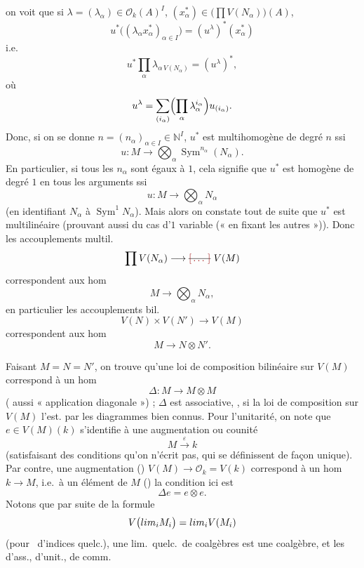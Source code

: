 \documentclass[11pt,a4paper]{article}
\begin{document}
\ill{} on voit que si $\lambda = (\lambda_\alpha) \in \mathcal{O}_k(A)^I$, $(x^*_\alpha) \in \bigl(\prod V(N_\alpha)\bigr)(A)$,
\[
  u^*\bigl((\lambda_\alpha x^*_\alpha)_{\alpha \in I}\bigr) = (u^\lambda)^*(x^*_\alpha)
\]
i.e.
\[
  u^* \prod_\alpha \lambda_{\alpha\, V(N_\alpha)} = (u^\lambda)^* ,
\]
où 
\[
  u^\lambda = \sum_{(i_\alpha)} \Bigl(\prod_\alpha \lambda_\alpha^{i_\alpha}\Bigr) u_{(i_\alpha)} .
\]
Donc, si on se donne $n = (n_\alpha)_{\alpha \in I} \in \mathbb{N}^I$, $u^*$ est multihomogène de degré $n$ ssi  \ill{}
\[
  u : M \longrightarrow \bigotimes_\alpha \operatorname{Sym}^{n_\alpha}(N_\alpha).
\]
En particulier, si tous les $n_\alpha$ sont égaux à $1$, cela signifie que $u^*$ est homogène de degré $1$ en tous les arguments ssi
\[
  u : M \longrightarrow \bigotimes_\alpha N_\alpha
\]
(en identifiant $N_\alpha$ à $\operatorname{Sym}^1 N_\alpha$). Mais alors on constate tout de suite que $u^*$ est \add{\ill{}} multilinéaire (prouvant aussi \struck{\ill{}} \ill{} \ill{} du cas d'$1$ variable (« en fixant les autres »)). Donc les accouplements multil.
\[
  \prod V(N_\alpha) \longrightarrow \text{\struck{\ill{}}}\ V(M)
\]
correspondent aux hom
\[
  M \longrightarrow \bigotimes_\alpha N_\alpha ,
\]
en particulier les accouplements bil.
\[
  V(N) \times V(N') \longrightarrow V(M)
\]
correspondent aux hom
\[
  M \longrightarrow N \otimes N' .
\]

Faisant $M = N = N'$, on trouve qu'une loi de composition bilinéaire sur $V(M)$ correspond à un hom
\[
  \Delta : M \longrightarrow M \otimes M
\]
( aussi « application diagonale ») ;  $\Delta$ est associative,  ,   si la loi de composition sur $V(M)$ l'est. \struck{\ill{}}  par les diagrammes bien connus. Pour l'unitarité, on note que $e \in V(M)(k)$ s'identifie à une augmentation ou counité
\[
  M \xrightarrow{\ \varepsilon\ } k
\]
(satisfaisant des conditions qu'on n'écrit pas, qui se définissent de façon unique). Par contre, une augmentation () $V(M) \to \mathcal{O}_k = V(k)$ correspond à un hom $k \to M$, i.e.\ à un élément de $M$ () la condition ici est
\[
  \Delta e = e \otimes e .
\]
Notons que par suite de la formule
\[
  V\bigl(\varinjlim_i M_i\bigr) = \varprojlim_i V(M_i)
\]
(pour \struck{\ill{}} \ d'indices quelc.), une lim.\ quelc.\ de coalgèbres est une coalgèbre, et les \struck{\ill{}}  d'ass., d'unit., de comm.
\end{document}
